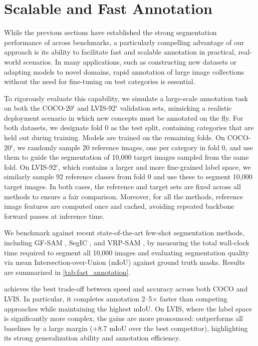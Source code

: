 \section{Scalable and Fast Annotation}
\label{sec:supp_scalable}
While the previous sections have established the strong segmentation performance of \ours{} across benchmarks, a particularly compelling advantage of our approach is its ability to facilitate fast and scalable annotation in practical, real-world scenarios. In many applications, such as constructing new datasets or adapting models to novel domains, rapid annotation of large image collections without the need for fine-tuning on test categories is essential.

To rigorously evaluate this capability, we simulate a large-scale annotation task on both the COCO-20$^i$ and LVIS-92$^i$ validation sets, mimicking a realistic deployment scenario in which new concepts must be annotated on the fly. For both datasets, we designate fold 0 as the test split, containing categories that are held out during training. Models are trained on the remaining folds. On COCO-20$^i$, we randomly sample 20 reference images, one per category in fold 0, and use them to guide the segmentation of 10,000 target images sampled from the same fold. On LVIS-92$^i$, which contains a larger and more fine-grained label space, we similarly sample 92 reference classes from fold 0 and use these to segment 10,000 target images. In both cases, the reference and target sets are fixed across all methods to ensure a fair comparison. Moreover, for all the methods, reference image features are computed once and cached, avoiding repeated backbone forward passes at inference time.



We benchmark \ours{} against recent state-of-the-art few-shot segmentation methods, including GF-SAM \cite{zhang2024bridge}, SegIC \cite{meng2024segic}, and VRP-SAM \cite{sun2024vrp}, by measuring the total wall-clock time required to segment all 10,000 images and evaluating segmentation quality via mean Intersection-over-Union (mIoU) against ground truth masks. Results are summarized in \cref{tab:fast_annotation}.

\ours{} achieves the best trade-off between speed and accuracy across both COCO and LVIS. In particular, it completes annotation 2--5$\times$ faster than competing approaches while maintaining the highest mIoU. On LVIS, where the label space is significantly more complex, the gains are more pronounced: \ours{} outperforms all baselines by a large margin (+8.7 mIoU over the best competitor), highlighting its strong generalization ability and annotation efficiency.



